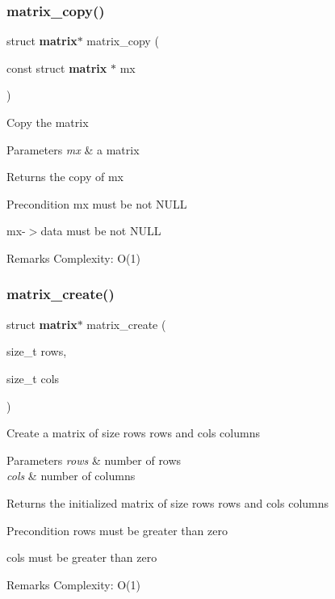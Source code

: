 \subsubsection{matrix\+\_\+copy()}
{\footnotesize\ttfamily struct \textbf{ matrix}$\ast$ matrix\+\_\+copy (\begin{DoxyParamCaption}\item[{const struct \textbf{ matrix} $\ast$}]{mx }\end{DoxyParamCaption})}

Copy the matrix


\begin{DoxyParams}{Parameters}
{\em mx} & a matrix \\
\hline
\end{DoxyParams}
\begin{DoxyReturn}{Returns}
the copy of {\ttfamily mx}
\end{DoxyReturn}
\begin{DoxyPrecond}{Precondition}
{\ttfamily mx} must be not N\+U\+LL 

{\ttfamily mx-\/$>$data} must be not N\+U\+LL
\end{DoxyPrecond}
\begin{DoxyRemark}{Remarks}
Complexity\+: O(1) 
\end{DoxyRemark}
\mbox{\label{matrix_8c_ad2d40d9c13eba774d6bb788021242a95}} 
\subsubsection{matrix\+\_\+create()}
{\footnotesize\ttfamily struct \textbf{ matrix}$\ast$ matrix\+\_\+create (\begin{DoxyParamCaption}\item[{size\+\_\+t}]{rows,  }\item[{size\+\_\+t}]{cols }\end{DoxyParamCaption})}

Create a matrix of size {\ttfamily rows} rows and {\ttfamily cols} columns


\begin{DoxyParams}{Parameters}
{\em rows} & number of rows \\
\hline
{\em cols} & number of columns\\
\hline
\end{DoxyParams}
\begin{DoxyReturn}{Returns}
the initialized matrix of size {\ttfamily rows} rows and {\ttfamily cols} columns
\end{DoxyReturn}
\begin{DoxyPrecond}{Precondition}
{\ttfamily rows} must be greater than zero 

{\ttfamily cols} must be greater than zero
\end{DoxyPrecond}
\begin{DoxyRemark}{Remarks}
Complexity\+: O(1) 
\end{DoxyRemark}
\mbox{\label{matrix_8c_ac19cd61ef9f183a9b92d6789399f8646}} 

